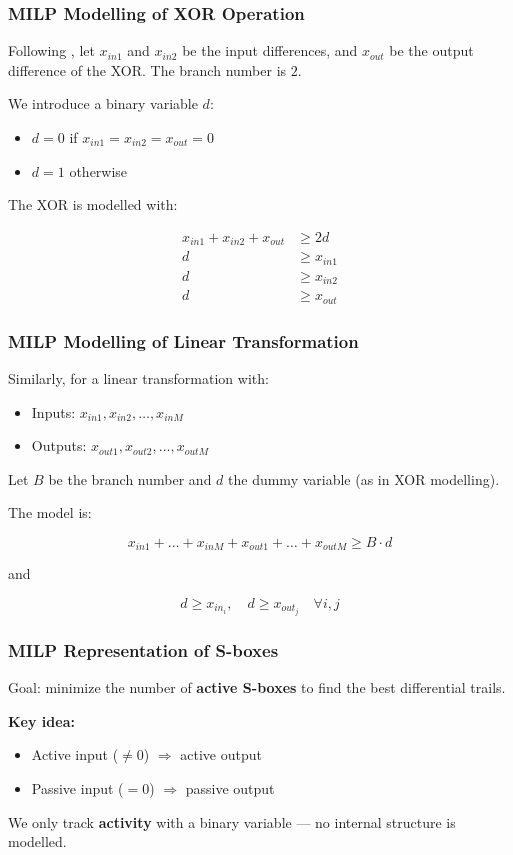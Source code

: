 \documentclass{beamer}
\begin{document}
\begin{frame}
\frametitle{MILP Modelling of XOR Operation}

Following \cite{mouha2012differential}, let $x_{in1}$ and $x_{in2}$ be the input differences, and $x_{out}$ be the output difference of the XOR.  
The branch number is $2$.

We introduce a binary variable $d$:
\begin{itemize}
    \item $d = 0$ if $x_{in1} = x_{in2} = x_{out} = 0$
    \item $d = 1$ otherwise
\end{itemize}

The XOR is modelled with:


\[
\begin{aligned}
x_{in1} + x_{in2} + x_{out} &\geq 2d \\
d &\geq x_{in1} \\
d &\geq x_{in2} \\
d &\geq x_{out}
\end{aligned}
\]



\end{frame}

\begin{frame}
\frametitle{MILP Modelling of Linear Transformation}

Similarly, for a linear transformation with:
\begin{itemize}
    \item Inputs: $x_{in1}, x_{in2}, \dots, x_{inM}$
    \item Outputs: $x_{out1}, x_{out2}, \dots, x_{outM}$
\end{itemize}

Let $B$ be the branch number and $d$ the dummy variable (as in XOR modelling).

The model is:


\[
x_{in1} + \dots + x_{inM} + x_{out1} + \dots + x_{outM} \geq B \cdot d
\]


and  


\[
d \geq x_{in_{i}},\quad d \geq x_{out_{j}} \quad \forall i,j
\]



\end{frame}

\begin{frame}
\frametitle{MILP Representation of S-boxes}

Goal: minimize the number of \textbf{active S-boxes} to find the best differential trails.

\textbf{Key idea:}
\begin{itemize}
    \item Active input ($\neq 0$) $\Rightarrow$ active output
    \item Passive input ($= 0$) $\Rightarrow$ passive output
\end{itemize}

We only track \textbf{activity} with a binary variable — no internal structure is modelled.
\end{frame}
\end{document}

